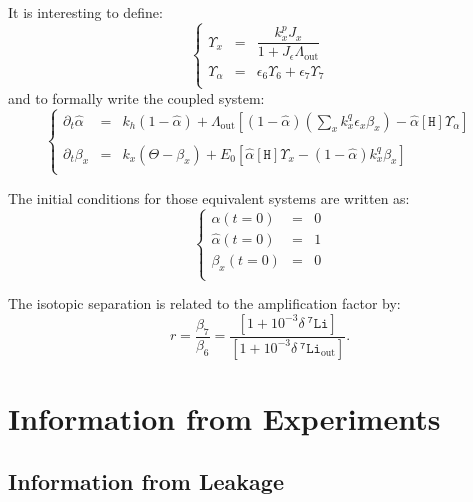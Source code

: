 \documentclass[aps,onecolumn,11pt]{revtex4}
\newcommand{\mychem}[1]{\mathtt{#1}}
\newcommand{\myconc}[1]{\left\lbrack{#1}\right\rbrack}
\newcommand{\spLi}[1]{{~^{\mychem{#1}}\mychem{Li}}}
\newcommand{\spproton}{\mychem{H}}
\newcommand{\proton}{\myconc{\spproton}}
\newcommand{\deltaLi}{ {\delta\!\!\!\spLi{7}} }
\newcommand{\deltaLiOut}{{\deltaLi}_{\mathrm{out}}}
\newcommand{\LiAll}{\Lambda}
\newcommand{\LiAllOut}{{\LiAll}_{\mathrm{out}}}
\begin{document}
It is interesting to define:
\begin{equation}
\label{eq:upsilon}
\left\lbrace
\begin{array}{rcl}
	\Upsilon_x & = & \dfrac{k^p_x J_x}{1+J_\epsilon \LiAllOut}\\
	\Upsilon_\alpha & = & \epsilon_6 \Upsilon_6 + \epsilon_7 \Upsilon_7\\
\end{array}
\right.
\end{equation}
and to formally write the coupled system:
\begin{equation}
\label{eq:sysall}
\left\lbrace
\begin{array}{rcl}
\partial_t \hat\alpha & = &
	 k_h \left(1-\hat\alpha\right) 
	 + \LiAllOut \left[ (1-\hat\alpha) \left( {\sum_x k_x^q \epsilon_x \beta_x} \right)  - \hat\alpha\proton \Upsilon_\alpha \right]\\
	 \\
	\partial_t \beta_x & = & k_x\left(\Theta - \beta_x\right) +E_0\left[ \hat\alpha  \proton \Upsilon_x - (1-\hat\alpha) k^q_x \beta_x \right]\\
\end{array}
\right.
\end{equation}

The initial conditions for those equivalent systems are written as:
\begin{equation}
\label{eq:ini}
\left\lbrace
\begin{array}{rcl}
\alpha(t=0) & = & 0\\
\hat\alpha(t=0) &= & 1\\
\beta_x(t=0)    &=& 0\\
\end{array}
\right.
\end{equation}

The isotopic separation is related to the amplification factor by:
\begin{equation}
	r=\dfrac{ \beta_7}{\beta_6} = \dfrac{\left[1+10^{-3}\deltaLi\right]}{\left[1+10^{-3}\deltaLiOut\right]}
	.
\end{equation}



\section{Information from Experiments}
\subsection{Information from Leakage}
\end{document}
